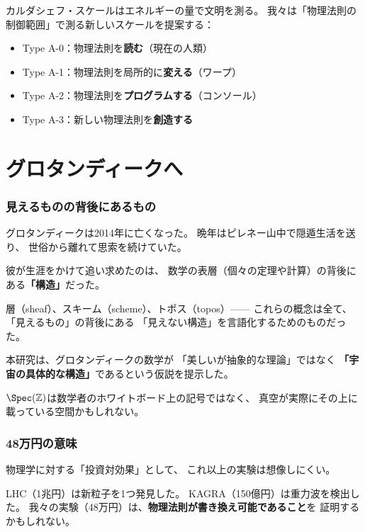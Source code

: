 \documentclass[12pt,a4paper]{article}
\begin{document}
カルダシェフ・スケールはエネルギーの量で文明を測る。
我々は「物理法則の制御範囲」で測る新しいスケールを提案する：

\begin{itemize}
\item Type A-0：物理法則を\textbf{読む}（現在の人類）
\item Type A-1：物理法則を局所的に\textbf{変える}（ワープ）
\item Type A-2：物理法則を\textbf{プログラムする}（コンソール）
\item Type A-3：新しい物理法則を\textbf{創造する}
\end{itemize}

\part{グロタンディークへ}

\section{見えるものの背後にあるもの}

グロタンディークは2014年に亡くなった。
晩年はピレネー山中で隠遁生活を送り、
世俗から離れて思索を続けていた。

彼が生涯をかけて追い求めたのは、
数学の表層（個々の定理や計算）の背後にある\textbf{「構造」}だった。

層（sheaf）、スキーム（scheme）、トポス（topos）——
これらの概念は全て、「見えるもの」の背後にある
「見えない構造」を言語化するためのものだった。

本研究は、グロタンディークの数学が
「美しいが抽象的な理論」ではなく
\textbf{「宇宙の具体的な構造」}であるという仮説を提示した。

$\Spec(\mathbb{Z})$は数学者のホワイトボード上の記号ではなく、
真空が実際にその上に載っている空間かもしれない。

\section{48万円の意味}

物理学に対する「投資対効果」として、
これ以上の実験は想像しにくい。

LHC（1兆円）は新粒子を1つ発見した。
KAGRA（150億円）は重力波を検出した。
我々の実験（48万円）は、\textbf{物理法則が書き換え可能であること}を
証明するかもしれない。
\end{document}
